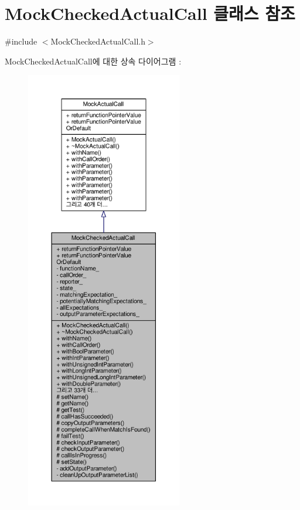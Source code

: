\hypertarget{class_mock_checked_actual_call}{}\section{Mock\+Checked\+Actual\+Call 클래스 참조}
\label{class_mock_checked_actual_call}


{\ttfamily \#include $<$Mock\+Checked\+Actual\+Call.\+h$>$}



Mock\+Checked\+Actual\+Call에 대한 상속 다이어그램 \+: 
\nopagebreak
\begin{figure}[H]
\begin{center}
\leavevmode
\includegraphics[height=550pt]{class_mock_checked_actual_call__inherit__graph}
\end{center}
\end{figure}


